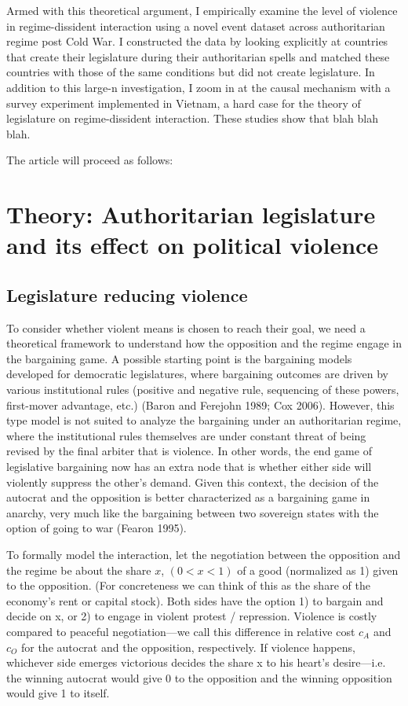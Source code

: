 \documentclass[12pt]{article}
\begin{document}
Armed with this theoretical argument, I empirically examine the level of violence in regime-dissident interaction using a novel event dataset across authoritarian regime post Cold War. I constructed the data by looking explicitly at countries that create their legislature during their authoritarian spells and matched these countries with those of the same conditions but did not create legislature. In addition to this large-n investigation, I zoom in at the causal mechanism with a survey experiment implemented in Vietnam, a hard case for the theory of legislature on regime-dissident interaction. These studies show that blah blah blah.

The article will proceed as follows:

\section{Theory: Authoritarian legislature and its effect on political violence}

\subsection{Legislature reducing violence}

To consider whether violent means is chosen to reach their goal, we need a theoretical framework to understand how the opposition and the regime engage in the bargaining game. A possible starting point is the bargaining models developed for democratic legislatures, where bargaining outcomes are driven by various institutional rules (positive and negative rule, sequencing of these powers, first-mover advantage, etc.) (Baron and Ferejohn 1989; Cox 2006). However, this type model is not suited to analyze the bargaining under an authoritarian regime, where the institutional rules themselves are under constant threat of being revised by the final arbiter that is violence. In other words, the end game of legislative bargaining now has an extra node that is whether either side will violently suppress the other’s demand. Given this context, the decision of the autocrat and the opposition is better characterized as a bargaining game in anarchy, very much like the bargaining between two sovereign states with the option of going to war (Fearon 1995).

To formally model the interaction, let the negotiation between the opposition and the regime be about the share $x$, $(0 < x < 1)$ of a good (normalized as 1) given to the opposition. (For concreteness we can think of this as the share of the economy’s rent or capital stock). Both sides have the option 1) to bargain and decide on x, or 2) to engage in violent protest / repression. Violence is costly compared to peaceful negotiation---we call this difference in relative cost $c_A$ and $c_O$ for the autocrat and the opposition, respectively. If violence happens, whichever side emerges victorious decides the share x to his heart’s desire---i.e. the winning autocrat would give 0 to the opposition and the winning opposition would give 1 to itself.
\end{document}
